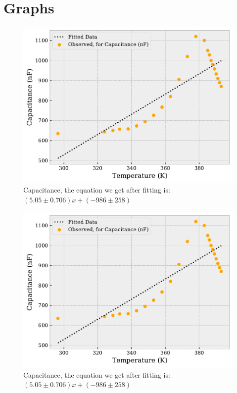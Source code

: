 \documentclass{double}
\begin{document}
\section{Graphs}
\begin{figure}[H]
\centering
\includegraphics[width = \columnwidth]{./Capacitancebeta0.pdf}
\caption{Capacitance, the equation we get after fitting is: $(5.05 \pm 0.706)x + (-986 \pm 258)$}
\label{g:"capacitance"}
\end{figure}\begin{figure}[H]
\centering
\includegraphics[width = \columnwidth]{./Capacitancealpha0.pdf}
\caption{Capacitance, the equation we get after fitting is: $(5.05 \pm 0.706)x + (-986 \pm 258)$}
\label{g:"capacitance"}
\end{figure}\begin{figure}[H]

\end{figure}
\end{document}
